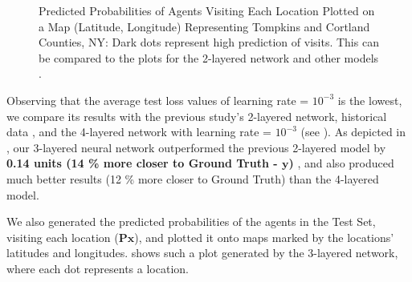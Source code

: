 \documentclass[12pt]{article}
\newcommand{\matr}[1]{\mathbf{#1}}  %
\begin{document}
\begin{figure}[!htbp]
\begin{minipage}{.48\textwidth}
            \caption[Predicted Probabilities of Agents Visiting Each Location Plotted on a Map (Latitude, Longitude) Representing Tompkins and Cortland Counties, NY]{Predicted Probabilities of Agents Visiting Each Location Plotted on a Map (Latitude, Longitude) Representing Tompkins and Cortland Counties, NY: Dark dots represent high prediction of visits. This can be compared to the plots for the 2-layered network and other models \cite[Figure 3]{Xue2016Avi2}.}
            \label{fig:Predicted Probabilities of Agents Visiting Each Location Plotted on a Map}
        \end{minipage}
    \end{figure}

    Observing that the average test loss values of learning rate = $10^{-3}$ is the lowest, we compare its results with the previous study's 2-layered network, historical data \cite[Table 1]{Xue2016Avi2}, and the 4-layered network with learning rate = $10^{-3}$ (see ). As depicted in , our 3-layered neural network outperformed the previous 2-layered model by \textbf{0.14 units (14 \% more closer to Ground Truth - $\matr{y}$)} \cite[Table 1]{Xue2016Avi2}, and also produced much better results (12 \% more closer to Ground Truth) than the 4-layered model.
    
    We also generated the predicted probabilities of the agents in the Test Set, visiting each location ($\matr{P}\matr{x}$), and plotted it onto maps marked by the locations' latitudes and longitudes.  shows such a plot generated by the 3-layered network, where each dot represents a location.
    
\end{document}
